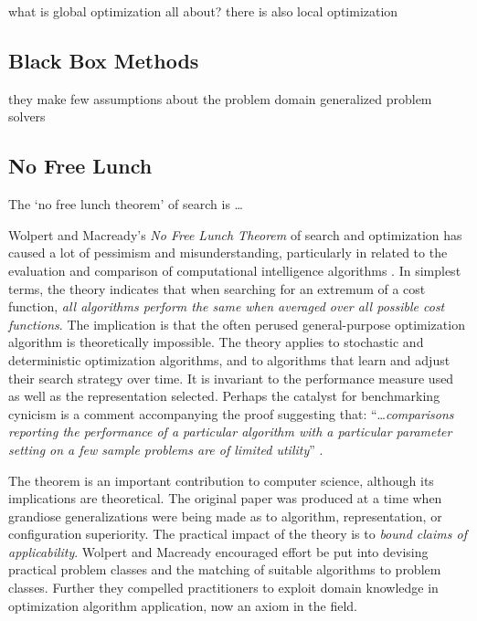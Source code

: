 \documentclass[a4paper, 11pt]{article}
\begin{document}
\label{sec:global_optimization}
what is global optimization all about?
there is also local optimization


% 
% 
\subsection{Black Box Methods}
they make few assumptions about the problem domain
generalized problem solvers



% 
% 
\subsection{No Free Lunch}
The `no free lunch theorem' of search is \ldots

Wolpert and Macready's \emph{No Free Lunch Theorem} of search and optimization has caused a lot of pessimism and misunderstanding, particularly in related to the evaluation and comparison of computational intelligence algorithms \cite{Wolpert1997, Wolpert1995}. In simplest terms, the theory indicates that when searching for an extremum of a cost function, \emph{all algorithms perform the same when averaged over all possible cost functions}. The implication is that the often perused general-purpose optimization algorithm is theoretically impossible. The theory applies to stochastic and deterministic optimization algorithms, and to algorithms that learn and adjust their search strategy over time. It is invariant to the performance measure used as well as the representation selected. Perhaps the catalyst for benchmarking cynicism is a comment accompanying the proof suggesting that: ``\ldots \emph{comparisons reporting the performance of a particular algorithm with a particular parameter setting on a few sample problems are of limited utility}'' \cite{Wolpert1997}.

The theorem is an important contribution to computer science, although its implications are theoretical. The original paper was produced at a time when grandiose generalizations were being made as to algorithm, representation, or configuration superiority. The practical impact of the theory is to \emph{bound claims of applicability}. Wolpert and Macready encouraged effort be put into devising practical problem classes and the matching of suitable algorithms to problem classes. Further they compelled practitioners to exploit domain knowledge in optimization algorithm application, now an axiom in the field.
\end{document}

